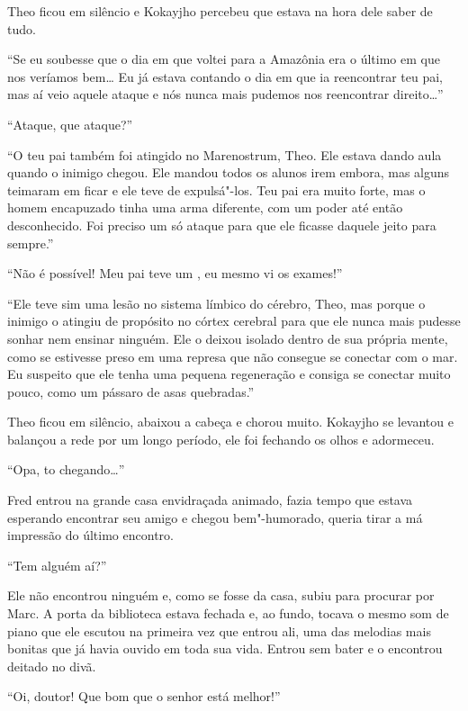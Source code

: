 Theo ficou em silêncio e Kokayjho percebeu que estava na hora dele saber
de tudo.

``Se eu soubesse que o dia em que voltei para a Amazônia era o último em
que nos veríamos bem\ldots{} Eu já estava contando o dia em que ia
reencontrar teu pai, mas aí veio aquele ataque e nós nunca mais pudemos
nos reencontrar direito\ldots{}''

``Ataque, que ataque?''

``O teu pai também foi atingido no Marenostrum, Theo. Ele estava dando
aula quando o inimigo chegou. Ele mandou todos os alunos irem embora, mas
alguns teimaram em ficar e ele teve de expulsá"-los. Teu pai era muito
forte, mas o homem encapuzado tinha uma arma diferente, com um poder até
então desconhecido. Foi preciso um só ataque para que ele ficasse
daquele jeito para sempre.''

``Não é possível! Meu pai teve um , eu mesmo vi os exames!''

``Ele teve sim uma lesão no sistema límbico do cérebro, Theo, mas porque
o inimigo o atingiu de propósito no córtex cerebral para que ele nunca
mais pudesse sonhar nem ensinar ninguém. Ele o deixou isolado dentro de
sua própria mente, como se estivesse preso em uma represa que não
consegue se conectar com o mar. Eu suspeito que ele tenha uma pequena
regeneração e consiga se conectar muito pouco, como um pássaro de asas
quebradas.''

Theo ficou em silêncio, abaixou a cabeça e chorou muito. Kokayjho se
levantou e balançou a rede por um longo período, ele foi fechando os
olhos e adormeceu.

\asterisc


``Opa, to chegando\ldots{}''

Fred entrou na grande casa envidraçada animado, fazia tempo que estava
esperando encontrar seu amigo e chegou bem"-humorado, queria tirar a má
impressão do último encontro.

``Tem alguém aí?''

Ele não encontrou ninguém e, como se fosse da casa, subiu para procurar
por Marc. A porta da biblioteca estava fechada e, ao fundo, tocava o
mesmo som de piano que ele escutou na primeira vez que entrou ali, uma
das melodias mais bonitas que já havia ouvido em toda sua vida. Entrou
sem bater e o encontrou deitado no divã.

``Oi, doutor! Que bom que o senhor está melhor!''

